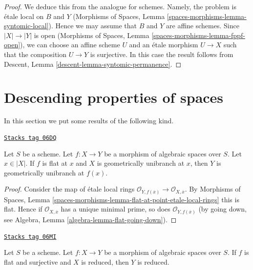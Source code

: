 \begin{proof}
We deduce this from the analogue for schemes.
Namely, the problem is \'etale local on $B$ and $Y$
(Morphisms of Spaces, Lemma
\ref{spaces-morphisms-lemma-syntomic-local}).
Hence we may assume that $B$ and $Y$ are affine
schemes. Since $|X| \to |Y|$ is open
(Morphisms of Spaces, Lemma \ref{spaces-morphisms-lemma-fppf-open}),
we can choose an affine
scheme $U$ and an \'etale morphism $U \to X$ such that the
composition $U \to Y$ is surjective. In this case the result
follows from Descent, Lemma
\ref{descent-lemma-syntomic-permanence}.
\end{proof}

\section{Descending properties of spaces}
\label{spaces-descent-section-descending-properties-spaces}
In this section we put some results of the following kind.

\begin{lemma}
\label{spaces-descent-lemma-descend-unibranch}
\href{https://stacks.math.columbia.edu/tag/06DQ}{\texttt{Stacks tag 06DQ}}

Let $S$ be a scheme.
Let $f : X \to Y$ be a morphism of algebraic spaces over $S$.
Let $x \in |X|$.
If $f$ is flat at $x$ and $X$ is geometrically unibranch at $x$, then $Y$ is
geometrically unibranch at $f(x)$.
\end{lemma}

\begin{proof}
Consider the map of \'etale local rings
$\mathcal{O}_{Y, f(\overline{x})} \to \mathcal{O}_{X, \overline{x}}$.
By
Morphisms of Spaces, Lemma
\ref{spaces-morphisms-lemma-flat-at-point-etale-local-rings}
this is flat. Hence if $\mathcal{O}_{X, \overline{x}}$ has a unique minimal
prime, so does $\mathcal{O}_{Y, f(\overline{x})}$ (by going down, see
Algebra, Lemma \ref{algebra-lemma-flat-going-down}).
\end{proof}

\begin{lemma}
\label{spaces-descent-lemma-descend-reduced}
\href{https://stacks.math.columbia.edu/tag/06MI}{\texttt{Stacks tag 06MI}}


Let $S$ be a scheme.
Let $f : X \to Y$ be a morphism of algebraic spaces over $S$.
If $f$ is flat and surjective and $X$ is reduced, then $Y$ is reduced.
\end{lemma}

